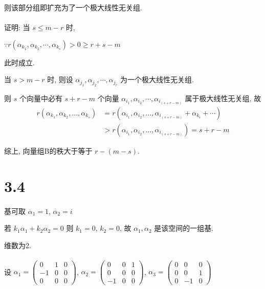 		 \setlength{\parindent}{0pt}
		 则该部分组即扩充为了一个极大线性无关组.


	 \paragraph{} %
		 证明: 当 \( s \leq m - r \) 时,

		 \( \because r(\alpha_{k_{1}}, \alpha_{k_{2}}, \cdots, \alpha_{k_{s}}) > 0 \geq r + s - m \)

		 此时成立.

		 当 \( s > m - r \) 时, 则设 \( \alpha_{j_{1}}, \alpha_{j_{2}}, \cdots, \alpha_{j_{r}} \) 为一个极大线性无关组.

		 则 \( s \) 个向量中必有 \( s + r - m \) 个向量 \( \alpha_{i_1}, \alpha_{i_2}, \cdots, \alpha_{i_{(s+r-m)}} \) 属于极大线性无关组, 故
		 \begin{align*}
			 r(\alpha_{k_{1}}, \alpha_{k_{2}}, \dots, \alpha_{k_{s}}) & = r(\alpha_{i_{1}}, \alpha_{i_{2}}, \dots, \alpha_{i_{(s+r-m)}} + \alpha_{k_{i}} + \cdots) \\
			                                                          & > r(\alpha_{i_{1}}, \alpha_{i_{2}}, \dots, \alpha_{i_{(s+r-m)}}) = s + r - m
		 \end{align*}

		 综上, 向量组B的秩大于等于 \( r - (m - s) \).


\section{3.4}

 \paragraph{} %
	 基可取 \( \alpha_{1} = 1 \), \( \alpha_{2} = i \)

	 若 \( k_{1}\alpha_{1} + k_{2}\alpha_{2} = 0 \) 则 \( k_{1} = 0 \), \( k_{2} = 0 \), 故 \( \alpha_{1}, \alpha_{2} \) 是该空间的一组基.

	 维数为2.


 \paragraph{} %
	 设 \( \alpha_{1} = \begin{pmatrix} 0 & 1 & 0 \\ -1 & 0 & 0 \\ 0 & 0 & 0 \end{pmatrix} \), \( \alpha_{2} = \begin{pmatrix} 0 & 0 & 1 \\ 0 & 0 & 0 \\ -1 & 0 & 0 \end{pmatrix} \), \( \alpha_{3} = \begin{pmatrix} 0 & 0 & 0 \\ 0 & 0 & 1 \\ 0 & -1 & 0 \end{pmatrix} \)

